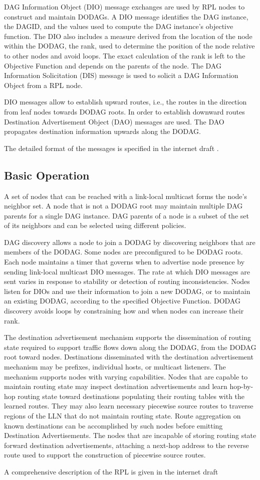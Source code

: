 DAG Information Object (DIO) message exchanges are used by RPL nodes to construct and maintain DODAGs. A DIO message identifies the DAG instance, the DAGID, and the values used to compute the DAG instance's objective function. The DIO also includes a measure derived from the location of the node within the DODAG, the rank, used to determine the position of the node relative to other nodes and avoid loops. The exact calculation of the rank is left to the Objective Function and  depends on the parents of the node. The DAG Information Solicitation (DIS) message is used to solicit a DAG Information Object from a RPL node. 

DIO messages allow to establish upward routes, i.e., the routes in the direction from leaf nodes towards DODAG roots.  In order to establish downward routes Destination Advertisement Object (DAO) messages are used. The DAO propagates destination information upwards along the DODAG. 

The detailed format of the messages is specified in the internet draft \cite{draft-rpl-04}.

\subsection{Basic Operation}
A set of nodes that can be reached with a link-local multicast forms the node's neighbor set. A node that is not a DODAG root may maintain multiple DAG parents for a single DAG instance. DAG parents of a node is a subset of the set of its neighbors and can be selected using different policies. 

DAG discovery allows a node to join a DODAG by discovering neighbors that are members of the DODAG.  Some nodes are preconfigured to be DODAG roots. Each node maintains a timer that governs when to advertise node presence by sending link-local multicast DIO messages. The rate at which DIO messages are sent varies in response to stability or detection of routing inconsistencies. Nodes listen for DIOs and use their information to join a new DODAG, or to maintain an existing DODAG, according to the specified Objective Function. DODAG discovery avoids loops by constraining how and when nodes can increase their rank.

The destination advertisement mechanism supports the dissemination of routing state required to support traffic flows down along the DODAG, from the DODAG root toward nodes. Destinations disseminated with the destination advertisement mechanism may be prefixes, individual hosts, or multicast listeners.  The mechanism supports nodes with varying capabilities. Nodes that are capable to maintain routing state may inspect destination advertisements and learn hop-by-hop routing state toward destinations populating their routing tables with the learned routes. They may also learn necessary piecewise source routes to traverse regions of the LLN that do not maintain routing state. Route aggregation on known destinations can be accomplished by such nodes before emitting Destination Advertisements. The nodes that are incapable of storing routing state forward destination advertisements, attaching a next-hop address to the reverse route used to support the construction of piecewise source routes.

A comprehensive description of the RPL is given in the internet draft \cite{draft-rpl-04}